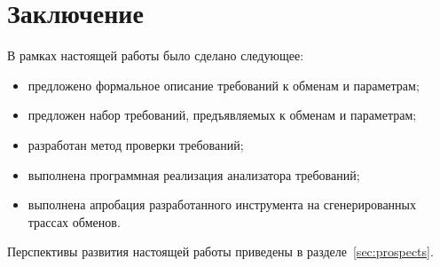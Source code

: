 \section{Заключение}

В рамках настоящей работы было сделано следующее:

\begin{itemize}
 \item предложено формальное описание требований к обменам и параметрам;
 \item предложен набор требований, предъявляемых к обменам и параметрам;
 \item разработан метод проверки требований;
 \item выполнена программная реализация анализатора требований;
 \item выполнена апробация разработанного инструмента на сгенерированных 
трассах обменов.
\end{itemize}

Перспективы развития настоящей работы приведены в разделе~\ref{sec:prospects}.

